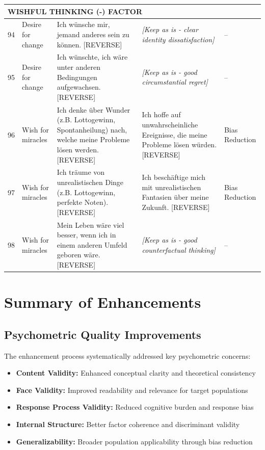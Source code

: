 \documentclass[12pt,a4paper]{article}
\begin{document}
\begin{longtable}{p{}p{}p{}p{}p{}}
\midrule
\multicolumn{5}{l}{\textbf{WISHFUL THINKING (-) FACTOR}} \\
\midrule

94 & Desire for change & Ich wünsche mir, jemand anderes sein zu können. [REVERSE] & \textit{[Keep as is - clear identity dissatisfaction]} & -- \\

95 & Desire for change & Ich wünschte, ich wäre unter anderen Bedingungen aufgewachsen. [REVERSE] & \textit{[Keep as is - good circumstantial regret]} & -- \\

96 & Wish for miracles & Ich denke über Wunder (z.B. Lottogewinn, Spontanheilung) nach, welche meine Probleme lösen werden. [REVERSE] & Ich hoffe auf unwahrscheinliche Ereignisse, die meine Probleme lösen würden. [REVERSE] & Bias Reduction \\

97 & Wish for miracles & Ich träume von unrealistischen Dinge (z.B. Lottogewinn, perfekte Noten). [REVERSE] & Ich beschäftige mich mit unrealistischen Fantasien über meine Zukunft. [REVERSE] & Bias Reduction \\

98 & Wish for miracles & Mein Leben wäre viel besser, wenn ich in einem anderen Umfeld geboren wäre. [REVERSE] & \textit{[Keep as is - good counterfactual thinking]} & -- \\

\end{longtable}

\section*{Summary of Enhancements}

\subsection*{Psychometric Quality Improvements}

The enhancement process systematically addressed key psychometric concerns:

\begin{itemize}
\item \textbf{Content Validity:} Enhanced conceptual clarity and theoretical consistency
\item \textbf{Face Validity:} Improved readability and relevance for target populations
\item \textbf{Response Process Validity:} Reduced cognitive burden and response bias
\item \textbf{Internal Structure:} Better factor coherence and discriminant validity
\item \textbf{Generalizability:} Broader population applicability through bias reduction
\end{itemize}
\end{document}
